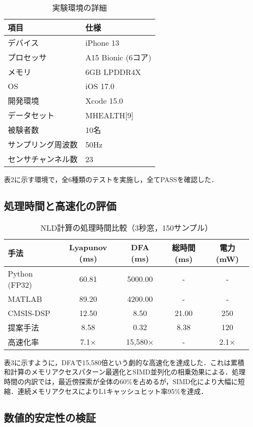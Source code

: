 \documentclass[10pt,twocolumn]{article}
\begin{document}
\begin{CJK}{UTF8}{min}
\begin{table}[t]
\caption{実験環境の詳細}
\centering
\begin{tabular}{ll}
\toprule
項目 & 仕様 \\
\midrule
デバイス & iPhone 13 \\
プロセッサ & A15 Bionic (6コア) \\
メモリ & 6GB LPDDR4X \\
OS & iOS 17.0 \\
開発環境 & Xcode 15.0 \\
データセット & MHEALTH[9] \\
被験者数 & 10名 \\
サンプリング周波数 & 50Hz \\
センサチャンネル数 & 23 \\
\bottomrule
\end{tabular}
\end{table}

表2に示す環境で，全6種類のテストを実施し，全てPASSを確認した．

\subsection{処理時間と高速化の評価}

\begin{table}[t]
\caption{NLD計算の処理時間比較（3秒窓，150サンプル）}
\centering
\begin{tabular}{lcccc}
\toprule
手法 & Lyapunov (ms) & DFA (ms) & 総時間 (ms) & 電力 (mW) \\
\midrule
Python (FP32) & 60.81 & 5000.00 & - & - \\
MATLAB & 89.20 & 4200.00 & - & - \\
CMSIS-DSP & 12.50 & 8.50 & 21.00 & 250 \\
提案手法 & 8.58 & 0.32 & 8.38 & 120 \\
\midrule
高速化率 & 7.1× & 15,580× & - & 2.1× \\
\bottomrule
\end{tabular}
\end{table}

表3に示すように，DFAで15,580倍という劇的な高速化を達成した．これは累積和計算のメモリアクセスパターン最適化とSIMD並列化の相乗効果による．処理時間の内訳では，最近傍探索が全体の60\%を占めるが，SIMD化により大幅に短縮．連続メモリアクセスによりL1キャッシュヒット率95\%を達成．

\subsection{数値的安定性の検証}


\end{CJK}
\end{document}
